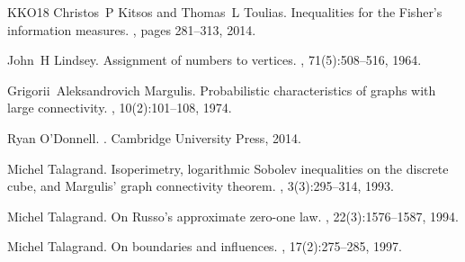 \documentclass[10pt]{article}
\begin{document}
\begin{thebibliography}{KKO18}
Christos~P Kitsos and Thomas~L Toulias.
\newblock Inequalities for the {F}isher’s information measures.
,
  pages 281--313, 2014.

John~H Lindsey.
\newblock Assignment of numbers to vertices.
, 71(5):508--516, 1964.

Grigorii~Aleksandrovich Margulis.
\newblock Probabilistic characteristics of graphs with large connectivity.
, 10(2):101--108, 1974.

Ryan O'Donnell.
.
\newblock Cambridge University Press, 2014.

Michel Talagrand.
\newblock Isoperimetry, logarithmic {S}obolev inequalities on the discrete
  cube, and {M}argulis' graph connectivity theorem.
, 3(3):295--314, 1993.

Michel Talagrand.
\newblock On {R}usso's approximate zero-one law.
, 22(3):1576--1587, 1994.

Michel Talagrand.
\newblock On boundaries and influences.
, 17(2):275--285, 1997.

\end{thebibliography}
\end{document}
